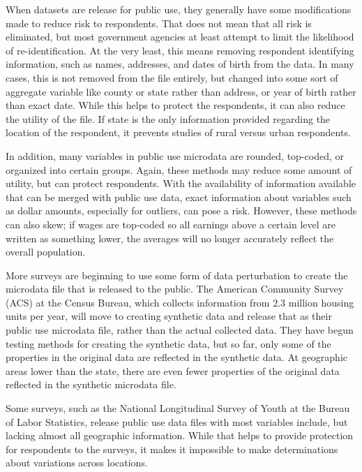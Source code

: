 \documentclass[12pt]{article}
\begin{document}
When datasets are release for public use, they generally have some modifications made to reduce risk to respondents. That does not mean that all risk is eliminated, but most government agencies at least attempt to limit the likelihood of re-identification. At the very least, this means removing respondent identifying information, such as names, addresses, and dates of birth from the data. In many cases, this is not removed from the file entirely, but changed into some sort of aggregate variable like county or state rather than address, or year of birth rather than exact date. While this helps to protect the respondents, it can also reduce the utility of the file. If state is the only information provided regarding the location of the respondent, it prevents studies of rural versus urban respondents.

In addition, many variables in public use microdata are rounded, top-coded, or organized into certain groups. Again, these methods may reduce some amount of utility, but can protect respondents. With the availability of information available that can be merged with public use data, exact information about variables such as dollar amounts, especially for outliers, can pose a risk. However, these methods can also skew; if wages are top-coded so all earnings above a certain level are written as something lower, the averages will no longer accurately reflect the overall population.

More surveys are beginning to use some form of data perturbation to create the microdata file that is released to the public. 
The American Community Survey (ACS) at the Census Bureau, which collects information from 2.3 million housing units per year, will move to creating synthetic data and release that as their public use microdata file, rather than the actual collected data. They have begun testing methods for creating the synthetic data, but so far, only some of the properties in the original data are reflected in the synthetic data. At geographic areas lower than the state, there are even fewer properties of the original data reflected in the synthetic microdata file.

Some surveys, such as the National Longitudinal Survey of Youth at the Bureau of Labor Statistics, release public use data files with most variables include, but lacking almost all geographic information. While that helps to provide protection for respondents to the surveys, it makes it impossible to make determinations about variations across locations.
\end{document}
